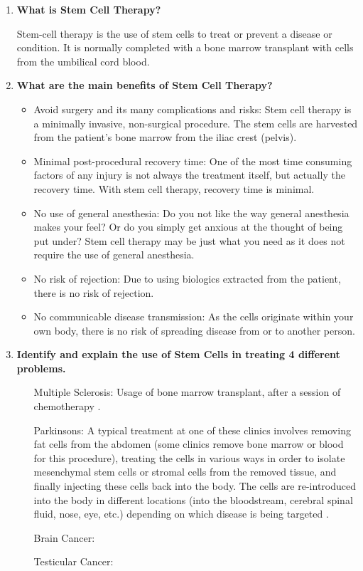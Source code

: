 \documentclass[a4paper]{article}
\begin{document}
\begin{enumerate}
    \item \textbf{What is Stem Cell Therapy? \cite{Mahla2016}}
   
Stem-cell therapy is the use of stem cells to treat or prevent a disease or condition. It is normally completed with a bone marrow transplant with cells from the umbilical cord blood. 

    \item \textbf{What are the main benefits of Stem Cell Therapy? \cite{Drparkercom2017} }

\begin{itemize}
	\item Avoid surgery and its many complications and risks: Stem cell therapy is a minimally invasive, non-surgical procedure. The stem cells are harvested from the patient’s bone marrow from the iliac crest (pelvis).
	\item Minimal post-procedural recovery time: One of the most time consuming factors of any injury is not always the treatment itself, but actually the recovery time. With stem cell therapy, recovery time is minimal.
	\item No use of general anesthesia: Do you not like the way general anesthesia makes your feel? Or do you simply get anxious at the thought of being put under? Stem cell therapy may be just what you need as it does not require the use of general anesthesia.
	\item No risk of rejection: Due to using biologics extracted from the patient, there is no risk of rejection.
	\item No communicable disease transmission: As the cells originate within your own body, there is no risk of spreading disease from or to another person.
\end{itemize}

    \item \textbf{Identify and explain the use of Stem Cells in treating 4 different problems.}
\begin{itemize}
\item[Multiple Sclerosis:] Usage of bone marrow transplant, after a session of chemotherapy \cite{WebMD2019}.
\item[Parkinsons:] A typical treatment at one of these clinics involves removing fat cells from the abdomen (some clinics remove bone marrow or blood for this procedure), treating the cells in various ways in order to isolate mesenchymal stem cells or stromal cells from the removed tissue, and finally injecting these cells back into the body. The cells are re-introduced into the body in different locations (into the bloodstream, cerebral spinal fluid, nose, eye, etc.) depending on which disease is being targeted \cite{REBECCAGILBERT2018}.
\item[Brain Cancer:]
\item[Testicular Cancer:]
\end{itemize}



\end{enumerate}
\end{document}
